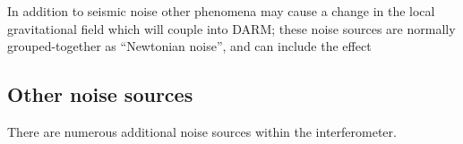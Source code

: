   In addition to seismic noise other phenomena may cause a change in
  the local gravitational field which will couple into DARM; these noise sources are normally grouped-together as ``Newtonian noise'', and can include the effect 
  
\subsection{Other noise sources}
\label{sec:other-noise-sources}
There are numerous additional noise sources within the interferometer.

